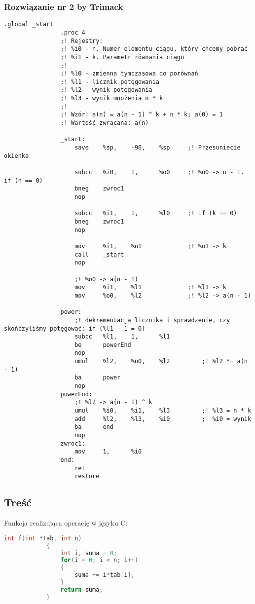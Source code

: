 		\subsubsection{Rozwiązanie nr 2 by Trimack}
			\begin{lstlisting}[language={[sparc]Assembler}]
				.global _start
				.proc 4
				;! Rejestry:
				;! %i0 - n. Numer elementu ciągu, który chcemy pobrać
				;! %i1 - k. Parametr równania ciągu
				;!
				;! %l0 - zmienna tymczasowa do porównań
				;! %l1 - licznik potęgowania
				;! %l2 - wynik potęgowania
				;! %l3 - wynik mnożenia n * k
				;!
				;! Wzór: a(n) = a(n - 1) ^ k + n * k; a(0) = 1
				;! Wartość zwracana: a(n)
				
				_start:
					save	%sp,	-96,	%sp 	;! Przesuniecie okienka
					
					subcc	%i0,	1,		%o0		;! %o0 -> n - 1. if (n == 0)
					bneg	zwroc1
					nop
					
					subcc	%i1,	1,		%l0		;! if (k == 0)
					bneg	zwroc1
					nop
					
					mov		%i1,	%o1				;! %o1 -> k
					call	_start
					nop
				
					;! %o0 -> a(n - 1)
					mov		%i1,	%l1				;! %l1 -> k
					mov		%o0,	%l2				;! %l2 -> a(n - 1)
				
				power:
					;! dekrementacja licznika i sprawdzenie, czy skończyliśmy potęgować: if (%l1 - 1 = 0)
					subcc	%l1,	1,		%l1		
					be		powerEnd
					nop
					umul	%l2,	%o0,	%l2			;! %l2 *= a(n - 1)
					ba		power
					nop
				powerEnd:
					;! %l2 -> a(n - 1) ^ k
					umul	%i0,	%i1,	%l3			;! %l3 = n * k
					add		%l2,	%l3,	%i0			;! %i0 = wynik
					ba		end
					nop
				zwroc1:
					mov		1,		%i0
				end:	
					ret
					restore
			\end{lstlisting}
		
	\newpage
		\subsection{Treść}
			Funkcja realizująca operację w języku C:
			\begin{lstlisting}[language=C]
			int f(int *tab, int n) 
			{
				int i, suma = 0;
				for(i = 0; i < n; i++)
				{
					suma += i*tab[i];
				}
				return suma;
			}
			\end{lstlisting}
